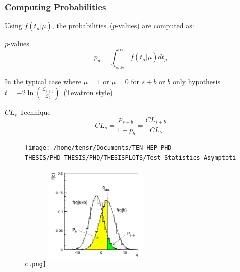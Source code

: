 \documentclass[12pt]{beamer}
\begin{document}
\begin{frame}
\frametitle{Computing Probabilities}
\begin{minipage}{\textwidth}
Using $f(t_{\mu}|\mu)$, the probabilities~($p$-values) are computed as: 
  \begin{varblock}[7cm]{$p$-values}
    \begin{equation*}
     p_{u} = \int^{\infty}_{t_{\mu,obs}} f(t_{\mu}|\mu) dt_{\mu}
    \end{equation*}
   \end{varblock}
\end{minipage}

\begin{minipage}{\textwidth}
\vspace{0.5cm}
In the typical case where $\mu=1$ or $\mu=0$ for $s+b$ or $b$ only hypothesis $t =-2\ln(\frac{\mathcal{L}_{s+b}}{\mathcal{L}_{b}})$~(Tevatron style)
  \begin{varblock}[7cm]{$CL_{s}$ Technique}
    \begin{equation*}
     CL_{s} = \frac{p_{s+b}}{1-p_{b}} = \frac{CL_{s+b}}{CL_{b}}
    \end{equation*}
   \end{varblock}
\end{minipage}
\end{frame}
\begin{frame}
\begin{figure}[ht]
\centering
\texttt{[image: /home/tensr/Documents/TEN-HEP-PHD-THESIS/PHD\_THESIS/PHD/THESISPLOTS/Test\_Statistics\_Asymptotic.png]}
\label{fig:Asymp}
 \hspace{0.1cm}
\includegraphics[height=5.5cm,width=5cm]{THESISPLOTS/TEST_STATISTICS.png}
\label{fig:TeV}
\end{figure}
\end{frame}
\end{document}
